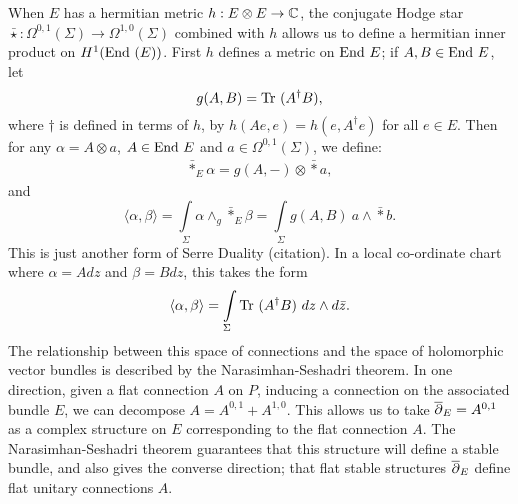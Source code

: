 	When $E$ has a hermitian metric $h:E\otimes E \to \mathbb{C}$, the conjugate Hodge star $\bar{\star}:\Omega^{0,1}(\Sigma) \to \Omega^{1,0}(\Sigma)$ combined with $h$ allows us to define a hermitian inner product on $H^1(\text{End } (E))$.  First $h$ defines a metric on $\text{End } E$; if $A,B\in \text{End } E$, let
	\begin{equation}
	g(A,B) = \text{Tr }(A^\dagger B),
	\end{equation}
	where $\dagger$ is defined in terms of $h$, by $h(Ae,e) = h(e,A^\dagger e)$ for all $e\in E$. Then for any $\alpha = A \otimes a$, $A\in \text{End } E$ and $a \in \Omega^{0,1}(\Sigma)$, we define:
	\begin{align}
	\bar{\ast}_E \alpha = g(A,-)\otimes \bar{\ast}a, 
	\end{align}
	and
	\begin{equation}
	\langle \alpha, \beta \rangle = \int\limits_\Sigma \alpha \wedge_g \bar{\ast}_E \beta =\int\limits_\Sigma g(A,B)~a\wedge \bar{\ast} b.
	\end{equation}
	This is just another form of Serre Duality (citation). In a local co-ordinate chart where $\alpha = Adz$ and $\beta = Bdz$, this takes the form
	\begin{equation}
	\langle \alpha, \beta \rangle = \int\limits_\Sigma \text{Tr }(A^\dagger B)~dz\wedge d\bar{z}.
	\end{equation}
	The relationship between this space of connections and the space of holomorphic vector bundles is described by the Narasimhan-Seshadri theorem. In one direction, given a flat connection $A$ on $P$, inducing a connection on the associated bundle $E$, we can decompose $A = A^{0,1} + A^{1,0}$. This allows us to take $\overline{\partial}_E = A^{0,1}$ as a complex structure on $E$ corresponding to the flat connection $A$. The Narasimhan-Seshadri theorem guarantees that this structure will define a stable bundle, and also gives the converse direction; that flat stable structures $\overline{\partial}_E$ define flat unitary connections $A$. 

